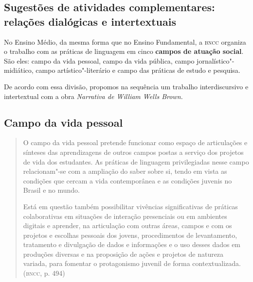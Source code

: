 \documentclass[11pt]{extarticle}
\begin{document}
\begin{enumerate}
\begin{enumerate}
\begin{enumerate}

\section{Sugestões de atividades complementares: relações dialógicas e intertextuais}



No Ensino Médio, da mesma forma que no Ensino Fundamental, a \textsc{bncc}
organiza o trabalho com as práticas de linguagem em cinco \textbf{campos
de atuação social}. São eles: campo da vida pessoal, campo da vida
pública, campo jornalístico"-midiático, campo artístico"-literário e campo
das práticas de estudo e pesquisa.

De acordo com essa divisão, propomos na sequência um trabalho
interdiscursivo e intertextual com a obra \emph{Narrativa de William
Wells Brown.}

\subsection{Campo da vida pessoal}

\begin{quote}
O campo da vida pessoal pretende funcionar como espaço de articulações
e sínteses das aprendizagens de outros campos postas a serviço dos
projetos de vida dos estudantes. As práticas de linguagem privilegiadas
nesse campo relacionam"-se com a ampliação do saber sobre si, tendo em
vista as condições que cercam a vida contemporânea e as condições
juvenis no Brasil e no mundo.

Está em questão também possibilitar vivências significativas de práticas
colaborativas em situações de interação presenciais ou em ambientes
digitais e aprender, na articulação com outras áreas, campos e com os
projetos e escolhas pessoais dos jovens, procedimentos de levantamento,
tratamento e divulgação de dados e informações e o uso desses dados em
produções diversas e na proposição de ações e projetos de natureza
variada, para fomentar o protagonismo juvenil de forma
contextualizada. (\textsc{bncc}, p. 494)
\end{quote}


\end{enumerate}
\end{enumerate}
\end{enumerate}
\end{document}
